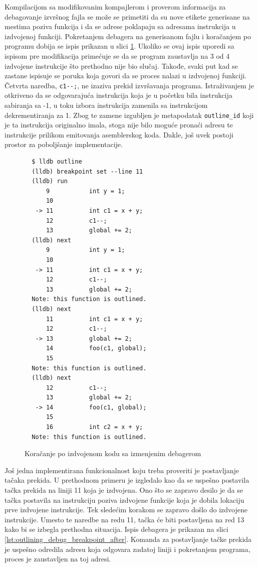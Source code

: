 \documentclass[12pt,oneside]{memoir}
\begin{document}
Kompilacijom sa modifikovanim kompajlerom i proverom informacija za debagovanje izvršnog fajla se može se primetiti da su nove etikete generisane na mestima poziva funkcija i da se adrese poklapaju sa adresama instrukcija u izdvojenoj funkciji.
Pokretanjem debagera na generisanom fajlu i koračanjem po programu dobija se ispis prikazan u slici \ref{lst:outlining_debug_step_after}.
Ukoliko se ovaj ispis uporedi sa ispisom pre modifikacija primećuje se da se program zaustavlja na 3 od 4 izdvojene instrukcije što prethodno nije bio slučaj.
Takođe, svaki put kad se zastane ispisuje se poruka koja govori da se proces nalazi u izdvojenoj funkciji.
Četvrta naredba, \verb|c1--;|, ne izaziva prekid izvršavanja programa.
Istraživanjem je otkriveno da se odgovarajuća instrukcija koja je u početku bila instrukcija sabiranja sa -1, u toku izbora instrukcija zamenila sa instrukcijom dekrementiranja za 1.
Zbog te zamene izgubljen je metapodatak \verb|outline_id| koji je ta instrukcija originalno imala, stoga nije bilo moguće pronaći adresu te instrukcije prilikom emitovanja asemblerskog koda.
% 
Dakle, još uvek postoji prostor za poboljšanje implementacije.

\begin{figure}[!ht]
\begin{verbatim}
  $ lldb outline
  (lldb) breakpoint set --line 11
  (lldb) run
      9           int y = 1;
      10          
   -> 11          int c1 = x + y;
      12          c1--;
      13          global += 2;
  (lldb) next
      9           int y = 1;
      10          
   -> 11          int c1 = x + y;
      12          c1--;
      13          global += 2;
  Note: this function is outlined.
  (lldb) next
      11          int c1 = x + y;
      12          c1--;
   -> 13          global += 2;
      14          foo(c1, global);
      15          
  Note: this function is outlined.
  (lldb) next
      12          c1--;
      13          global += 2;
   -> 14          foo(c1, global);
      15          
      16          int c2 = x + y;
  Note: this function is outlined.
\end{verbatim}
\caption{Koračanje po izdvojenom kodu sa izmenjenim debagerom}
\label{lst:outlining_debug_step_after}
\end{figure}

Još jedna implementirana funkcionalnost koju treba proveriti je postavljanje tačaka prekida.
U prethodnom primeru je izgledalo kao da se uspešno postavila tačka prekida na liniji 11 koja je izdvojena.
Ono što se zapravo desilo je da se tačka postavila na instrukciju poziva izdvojene funkcije koja je dobila lokaciju prve izdvojene instrukcije.
Tek sledećim korakom se zapravo došlo do izdvojene instrukcije.
Umesto te naredbe na redu 11, tačka će biti postavljena na red 13 kako bi se izbegla prethodna situacija.
Ispis debagera je prikazan na slici \ref{lst:outlining_debug_breakpoint_after}.
Komanda za postavljanje tačke prekida je uspešno odredila adresu koja odgovara zadatoj liniji i pokretanjem programa, proces je zaustavljen na toj adresi.
\end{document}
